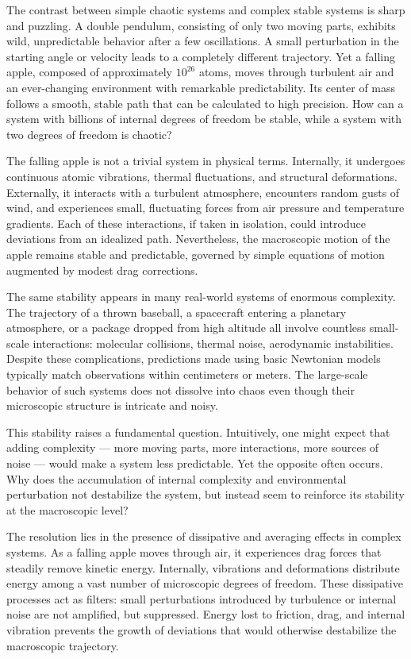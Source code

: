 The contrast between simple chaotic systems and complex stable systems is sharp and puzzling. A double pendulum, consisting of only two moving parts, exhibits wild, unpredictable behavior after a few oscillations. A small perturbation in the starting angle or velocity leads to a completely different trajectory. Yet a falling apple, composed of approximately $10^{26}$ atoms, moves through turbulent air and an ever-changing environment with remarkable predictability. Its center of mass follows a smooth, stable path that can be calculated to high precision. How can a system with billions of internal degrees of freedom be stable, while a system with two degrees of freedom is chaotic?

The falling apple is not a trivial system in physical terms. Internally, it undergoes continuous atomic vibrations, thermal fluctuations, and structural deformations. Externally, it interacts with a turbulent atmosphere, encounters random gusts of wind, and experiences small, fluctuating forces from air pressure and temperature gradients. Each of these interactions, if taken in isolation, could introduce deviations from an idealized path. Nevertheless, the macroscopic motion of the apple remains stable and predictable, governed by simple equations of motion augmented by modest drag corrections.

The same stability appears in many real-world systems of enormous complexity. The trajectory of a thrown baseball, a spacecraft entering a planetary atmosphere, or a package dropped from high altitude all involve countless small-scale interactions: molecular collisions, thermal noise, aerodynamic instabilities. Despite these complications, predictions made using basic Newtonian models typically match observations within centimeters or meters. The large-scale behavior of such systems does not dissolve into chaos even though their microscopic structure is intricate and noisy.

This stability raises a fundamental question. Intuitively, one might expect that adding complexity — more moving parts, more interactions, more sources of noise — would make a system less predictable. Yet the opposite often occurs. Why does the accumulation of internal complexity and environmental perturbation not destabilize the system, but instead seem to reinforce its stability at the macroscopic level?

The resolution lies in the presence of dissipative and averaging effects in complex systems. As a falling apple moves through air, it experiences drag forces that steadily remove kinetic energy. Internally, vibrations and deformations distribute energy among a vast number of microscopic degrees of freedom. These dissipative processes act as filters: small perturbations introduced by turbulence or internal noise are not amplified, but suppressed. Energy lost to friction, drag, and internal vibration prevents the growth of deviations that would otherwise destabilize the macroscopic trajectory.

